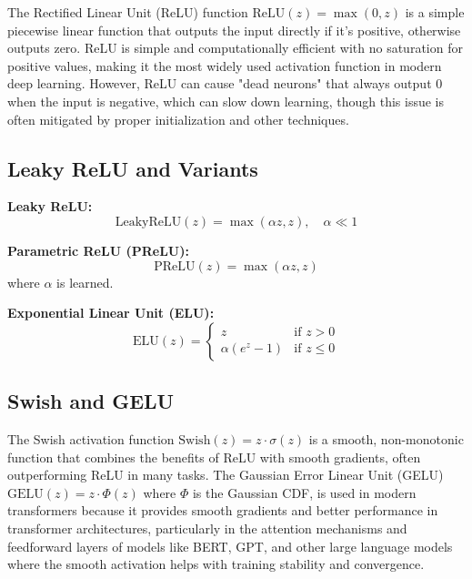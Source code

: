 The Rectified Linear Unit (ReLU) function $\text{ReLU}(z) = \max(0, z)$ is a simple piecewise linear function that outputs the input directly if it's positive, otherwise outputs zero. ReLU is simple and computationally efficient with no saturation for positive values, making it the most widely used activation function in modern deep learning. However, ReLU can cause "dead neurons" that always output 0 when the input is negative, which can slow down learning, though this issue is often mitigated by proper initialization and other techniques.

\subsection{Leaky ReLU and Variants}

\textbf{Leaky ReLU:}
\begin{equation}
\text{LeakyReLU}(z) = \max(\alpha z, z), \quad \alpha \ll 1
\end{equation}

\textbf{Parametric ReLU (PReLU):}
\begin{equation}
\text{PReLU}(z) = \max(\alpha z, z)
\end{equation}
where $\alpha$ is learned.

\textbf{Exponential Linear Unit (ELU):}
\begin{equation}
\text{ELU}(z) = \begin{cases}
z & \text{if } z > 0 \\
\alpha(e^z - 1) & \text{if } z \leq 0
\end{cases}
\end{equation}

\subsection{Swish and GELU}

The Swish activation function $\text{Swish}(z) = z \cdot \sigma(z)$ is a smooth, non-monotonic function that combines the benefits of ReLU with smooth gradients, often outperforming ReLU in many tasks. The Gaussian Error Linear Unit (GELU) $\text{GELU}(z) = z \cdot \Phi(z)$ where $\Phi$ is the Gaussian CDF, is used in modern transformers because it provides smooth gradients and better performance in transformer architectures, particularly in the attention mechanisms and feedforward layers of models like BERT, GPT, and other large language models where the smooth activation helps with training stability and convergence.

